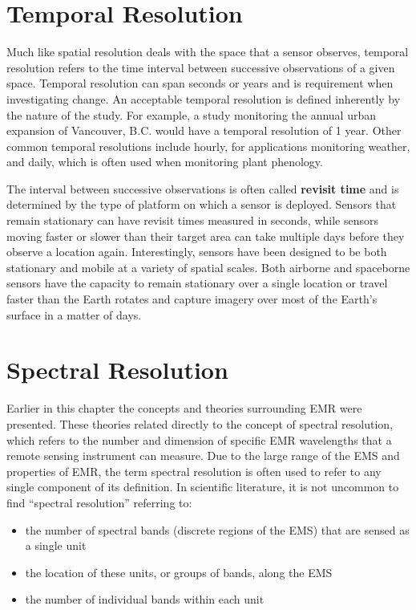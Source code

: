 \documentclass[
]{book}
\providecommand{\tightlist}{%
  \setlength{\itemsep}{0pt}\setlength{\parskip}{0pt}}
\begin{document}
\section{Temporal Resolution}\label{temporal-resolution}

Much like spatial resolution deals with the space that a sensor observes, temporal resolution refers to the time interval between successive observations of a given space. Temporal resolution can span seconds or years and is requirement when investigating change. An acceptable temporal resolution is defined inherently by the nature of the study. For example, a study monitoring the annual urban expansion of Vancouver, B.C. would have a temporal resolution of 1 year. Other common temporal resolutions include hourly, for applications monitoring weather, and daily, which is often used when monitoring plant phenology.

The interval between successive observations is often called \textbf{revisit time} and is determined by the type of platform on which a sensor is deployed. Sensors that remain stationary can have revisit times measured in seconds, while sensors moving faster or slower than their target area can take multiple days before they observe a location again. Interestingly, sensors have been designed to be both stationary and mobile at a variety of spatial scales. Both airborne and spaceborne sensors have the capacity to remain stationary over a single location or travel faster than the Earth rotates and capture imagery over most of the Earth's surface in a matter of days.

\section{Spectral Resolution}\label{spectral-resolution}

Earlier in this chapter the concepts and theories surrounding EMR were presented. These theories related directly to the concept of spectral resolution, which refers to the number and dimension of specific EMR wavelengths that a remote sensing instrument can measure. Due to the large range of the EMS and properties of EMR, the term spectral resolution is often used to refer to any single component of its definition. In scientific literature, it is not uncommon to find ``spectral resolution'' referring to:

\begin{itemize}
\tightlist
\item
  the number of spectral bands (discrete regions of the EMS) that are sensed as a single unit
\item
  the location of these units, or groups of bands, along the EMS
\item
  the number of individual bands within each unit
\end{itemize}
\end{document}
